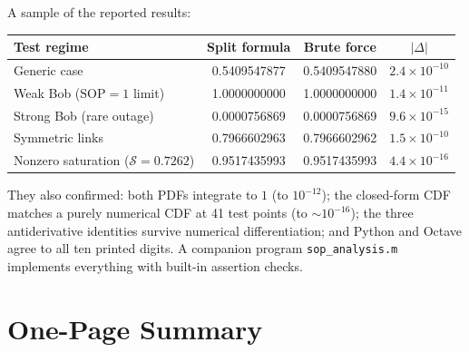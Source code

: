 \documentclass[11pt]{article}
\begin{document}
A sample of the reported results:

\begin{center}\small
\begin{tabular}{lccc}
\toprule
Test regime & Split formula & Brute force & $|\Delta|$\\
\midrule
Generic case & 0.5409547877 & 0.5409547880 & $2.4\times10^{-10}$\\
Weak Bob ($\mathrm{SOP}=1$ limit) & 1.0000000000 & 1.0000000000 & $1.4\times10^{-11}$\\
Strong Bob (rare outage) & 0.0000756869 & 0.0000756869 & $9.6\times10^{-15}$\\
Symmetric links & 0.7966602963 & 0.7966602962 & $1.5\times10^{-10}$\\
Nonzero saturation ($\mathcal S=0.7262$) & 0.9517435993 & 0.9517435993 & $4.4\times10^{-16}$\\
\bottomrule
\end{tabular}
\end{center}

They also confirmed: both PDFs integrate to $1$ (to $10^{-12}$); the closed-form CDF
matches a purely numerical CDF at 41 test points (to $\sim 10^{-16}$); the three
antiderivative identities survive numerical differentiation; and Python and Octave
agree to all ten printed digits. A companion program \texttt{sop\_analysis.m}
implements everything with built-in assertion checks.

\section{One-Page Summary}
\end{document}
